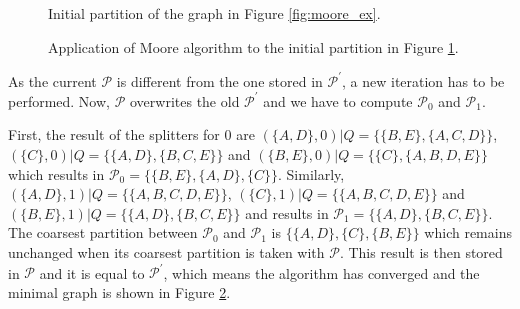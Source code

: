 {\begin{figure}
\centering
{}
\caption{Initial partition of the graph in Figure \ref{fig:moore_ex}.\label{fig:moore_ini}}
\end{figure}

\begin{figure}
\centering
{}
\caption{Application of Moore algorithm to the initial partition in Figure \ref{fig:moore_ini}.\label{fig:moore_fin}}
\end{figure}

As the current $\mathcal{P}$ is different from the one stored in $\mathcal{P}^{\prime}$, a new iteration has to be performed. Now, $\mathcal{P}$ overwrites the old $\mathcal{P}^{\prime}$ and we have to compute $\mathcal{P}_0$ and $\mathcal{P}_1$.

First, the result of the splitters for 0 are $(\{A,D\},0)|Q = \{\{B,E\},\{A,C,D\}\}$, $(\{C\},0)|Q = \{\{A,D\},\{B,C,E\}\}$ and $(\{B,E\},0)|Q = \{\{C\},\{A,B,D,E\}\}$ which results in $\mathcal{P}_0 = \{\{B,E\}, \{A,D\}, \{C\}\}$. Similarly, $(\{A,D\},1)|Q = \{\{A,B,C,D,E\}\}$, $(\{C\},1)|Q = \{\{A,B,C,D,E\}\}$ and $(\{B,E\},1)|Q = \{\{A,D\},\{B,C,E\}\}$ and results in $\mathcal{P}_1 = \{\{A,D\},\{B,C,E\}\}$. The coarsest partition between $\mathcal{P}_0$ and $\mathcal{P}_1$ is $\{\{A,D\},\{C\},\{B,E\}\}$ which remains unchanged when its coarsest partition is taken with $\mathcal{P}$. This result is then stored in $\mathcal{P}$ and it is equal to $\mathcal{P}^{\prime}$, which means the algorithm has converged and the minimal graph is shown in Figure \ref{fig:moore_fin}.

}
